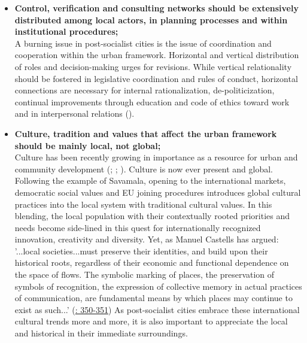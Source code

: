 \documentclass[11pt]{report}
\begin{document}
{{{\begin{itemize}
\item \textbf{Control, verification and consulting networks should be extensively distributed among local actors, in planning processes and within institutional procedures;}
\\
A burning issue in post-socialist cities is the issue of coordination and cooperation within the urban framework.
Horizontal and vertical distribution of roles and decision-making urges for revisions.
While vertical relationality should be fostered in legislative coordination and rules of conduct, horizontal connections are necessary for internal rationalization, de-politicization, continual improvements through education and code of ethics toward work and in interpersonal relations (\href{Vujosevic}{\citealt{vujosevic_regionalizam_2015}}).
     
\item \textbf{Culture, tradition and values that affect the urban framework should be mainly local, not global;}
\\
Culture has been recently growing in importance as a resource for urban  and  community development (\href{Bianchini}{\citealt{Bianchini 1999}}; \href{Mercer}{\citealt{mercer_cultural_2006}}; \href{Volic} {\citealt{volic_belgrade_2012}}).
Culture is now ever present and global. Following the example of Savamala, opening to the international markets, democratic social values and EU joining procedures introduces global cultural practices into the local system with traditional cultural values. In this blending, the local population with their contextually rooted priorities and needs become side-lined in this quest for internationally recognized innovation, creativity and diversity.
Yet, as Manuel Castells has
argued:
'...local societies...must preserve their identities, and build upon their historical roots,
regardless of their economic and functional dependence on the space of flows. The
symbolic marking of places, the preservation of symbols of recognition, the expression
of collective memory in actual practices of communication, are fundamental means by
which places may continue to exist as such...' (\href{Castells}{\citealt{castells_informational_1991}: 350-351})
As post-socialist cities embrace these international cultural trends more and more, it is also important to appreciate the local and historical in their immediate surroundings.


\end{itemize}}}}
\end{document}
